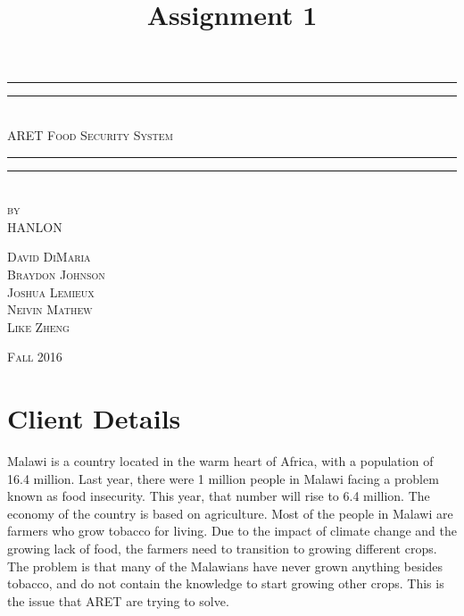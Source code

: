 \documentclass[12pt,letterpaper]{article}
\title{Assignment 1}
\begin{document}
\begin{titlepage}
    \centering
    \vspace*{\baselineskip}
    \rule{\textwidth}{1.6pt}\vspace*{-\baselineskip}\vspace*{2pt}
    \rule{\textwidth}{0.4pt}\\[1.5\baselineskip]
    {\LARGE \textsc{ARET Food Security System}}\\[\baselineskip]
	\rule{\textwidth}{0.4pt}\vspace*{-\baselineskip}\vspace{4pt}    
    \rule{\textwidth}{2pt}\\[2\baselineskip]
   
    \vspace*{5\baselineskip}
    \textsc{by}\\[0.25\baselineskip]
    {\LARGE HANLON} \\
    
    \vspace*{\baselineskip}
    {\textsc{David DiMaria \\ Braydon Johnson \\ Joshua Lemieux \\ Neivin Mathew \\ Like Zheng} \par}
    \vfill
    {\scshape Fall 2016} \\   
  \end{titlepage}
  
  
\tableofcontents
\lhead{} %
\clearpage
{} %
    
\section{Client Details}
Malawi is a country located in the warm heart of Africa, with a population of 16.4 million. Last year, there were 1 million people in Malawi facing a problem known as food insecurity. This year, that number will rise to 6.4 million. The economy of the country is based on agriculture. Most of the people in Malawi are farmers who grow tobacco for living. Due to the impact of climate change and the growing lack of food, the farmers need to transition to growing different crops. The problem is that many of the Malawians have never grown anything besides tobacco, and do not contain the knowledge to start growing other crops. This is the issue that ARET are trying to solve. \par
\end{document}

